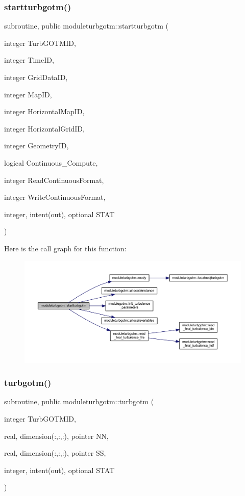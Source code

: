 \subsubsection{\texorpdfstring{startturbgotm()}{startturbgotm()}}
{\footnotesize\ttfamily subroutine, public moduleturbgotm\+::startturbgotm (\begin{DoxyParamCaption}\item[{integer}]{Turb\+G\+O\+T\+M\+ID,  }\item[{integer}]{Time\+ID,  }\item[{integer}]{Grid\+Data\+ID,  }\item[{integer}]{Map\+ID,  }\item[{integer}]{Horizontal\+Map\+ID,  }\item[{integer}]{Horizontal\+Grid\+ID,  }\item[{integer}]{Geometry\+ID,  }\item[{logical}]{Continuous\+\_\+\+Compute,  }\item[{integer}]{Read\+Continuous\+Format,  }\item[{integer}]{Write\+Continuous\+Format,  }\item[{integer, intent(out), optional}]{S\+T\+AT }\end{DoxyParamCaption})}

Here is the call graph for this function\+:\nopagebreak
\begin{figure}[H]
\begin{center}
\leavevmode
\includegraphics[width=350pt]{namespacemoduleturbgotm_ade6cfc34dc78769397885a40df0e608b_cgraph}
\end{center}
\end{figure}
\mbox{\label{namespacemoduleturbgotm_ab0d8f0e83e75ef88108e4b2bf04543c0}} 
\subsubsection{\texorpdfstring{turbgotm()}{turbgotm()}}
{\footnotesize\ttfamily subroutine, public moduleturbgotm\+::turbgotm (\begin{DoxyParamCaption}\item[{integer}]{Turb\+G\+O\+T\+M\+ID,  }\item[{real, dimension(\+:,\+:,\+:), pointer}]{NN,  }\item[{real, dimension(\+:,\+:,\+:), pointer}]{SS,  }\item[{integer, intent(out), optional}]{S\+T\+AT }\end{DoxyParamCaption})}

